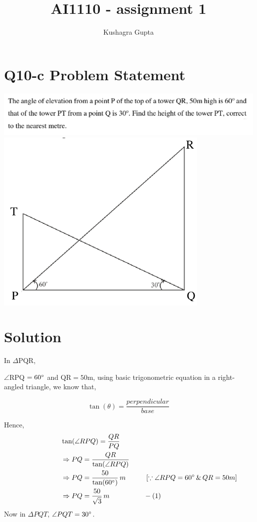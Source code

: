 \documentclass{article}
\title{AI1110 - assignment 1}
\author{Kushagra Gupta}
\begin{document}
\maketitle    
\section*{Q10-c Problem Statement}
\includegraphics[width=\textwidth]{Q.png}
\includegraphics[width=\textwidth]{figure.png}

\pagebreak
\section*{Solution}

In $\Delta$PQR, 

$\angle$RPQ  $= 60\degree$ and QR$ = 50$m, using basic trigonometric equation in a right-angled triangle, we know that,

$$\tan(\theta)=\frac{perpendicular}{base}$$

\noindent Hence, 
\begin{align*}
\hspace{60pt}&\tan(\angle RPQ) = \frac{QR}{PQ} \\
&\Rightarrow PQ = \frac{QR}{\tan(\angle RPQ)} \\
&\Rightarrow PQ = \frac{50}{\tan(60\degree)}\, m
\hspace{30pt}[\because \angle RPQ = 60\degree \, \& \, QR = 50m] \\
&\Rightarrow PQ = \frac{50}{\sqrt{3}}\, m \hspace{50pt}-(1)
\end{align*}
Now in $\Delta PQT$, $\angle PQT = 30\degree$.
\end{document}

